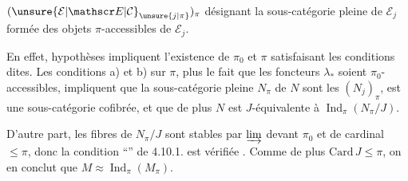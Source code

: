 $(\unsure{\mathcal E|\mathscr E|\mathcal C}_{\unsure{j|\pi}})_\pi$ désignant la sous-catégorie pleine de $\mathcal E_j$ formée des objets $\pi$-accessibles de $\mathcal E_j$.

En effet,  hypothèses  impliquent l'existence de $\pi_0$ et $\pi$ satisfaisant les conditions dites. Les conditions a) et b) sur $\pi$, \deleted{$\unsure{\pi}$} plus le fait que les foncteurs $\lambda_*$ soient $\pi_0$-accessibles, impliquent que la sous-catégorie  pleine $N_\pi$ de $N$  sont les $(N_j)_\pi$, est une sous-catégorie cofibrée, et que de plus $N$ est $J$-équivalente à $\operatorname{Ind}_\pi(N_\pi/J)$.

 D'autre part, les fibres de $N_\pi/J$ sont stables par $\varinjlim$  devant $\pi_0$ et de cardinal $\leq\pi$, donc la condition ``'' de 4.10.1. est vérifiée .  Comme de plus $\mathrm{Card}\,J\leq\pi$, on en conclut  que  $M\approx\operatorname{Ind}_\pi(M_\pi)$.
